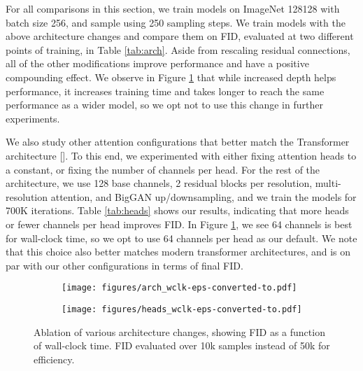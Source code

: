 \documentclass{article}
\newcommand{\shortcite}[1]{[\citenum{#1}]}
\begin{document}
For all comparisons in this section, we train models on ImageNet 128128 with batch size 256, and sample using 250 sampling steps. We train models with the above architecture changes and compare them on FID, evaluated at two different points of training, in Table \ref{tab:arch}. Aside from rescaling residual connections, all of the other modifications improve performance and have a positive compounding effect. We observe in Figure \ref{fig:arch} that while increased depth helps performance, it increases training time and takes longer to reach the same performance as a wider model, so we opt not to use this change in further experiments. 

We also study other attention configurations that better match the Transformer architecture \shortcite{transformer}. To this end, we experimented with either fixing attention heads to a constant, or fixing the number of channels per head. For the rest of the architecture, we use 128 base channels, 2 residual blocks per resolution, multi-resolution attention, and BigGAN up/downsampling, and we train the models for 700K iterations. Table \ref{tab:heads} shows our results, indicating that more heads or fewer channels per head improves FID. In Figure \ref{fig:arch}, we see 64 channels is best for wall-clock time, so we opt to use 64 channels per head as our default. We note that this choice also better matches modern transformer architectures, and is on par with our other configurations in terms of final FID.

\begin{figure}[t]
    \begin{center}
    \begin{subfigure}{0.45\textwidth}
        \centering
        \texttt{[image: figures/arch\_wclk-eps-converted-to.pdf]}
    \end{subfigure}
    \hspace{0.025\textwidth}
    \begin{subfigure}{0.45\textwidth}
        \centering
        \texttt{[image: figures/heads\_wclk-eps-converted-to.pdf]}
    \end{subfigure}
    \end{center}
    \caption{\label{fig:arch} Ablation of various architecture changes, showing FID as a function of wall-clock time. FID evaluated over 10k samples instead of 50k for efficiency.}
\end{figure}
\end{document}
